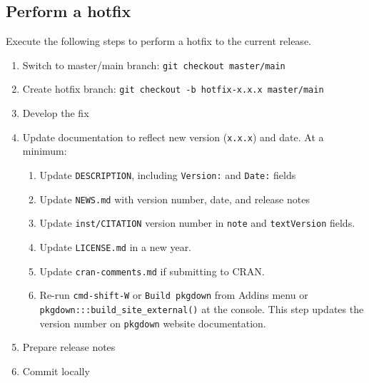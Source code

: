\documentclass{article}
\begin{document}
\subsection{Perform a hotfix} 
\label{sec:hotfix}

Execute the following steps to perform a hotfix to the current release.

\begin{enumerate}

  \item Switch to master/main branch: \texttt{git checkout master/main} 

  \item Create hotfix branch: \texttt{git checkout -b hotfix-x.x.x master/main} 
	
  \item Develop the fix
	
  \item Update documentation to reflect new version (\texttt{x.x.x}) and date.
        At a minimum:
  \begin{enumerate}

    \item Update \texttt{DESCRIPTION}, including \texttt{Version:} and \texttt{Date:} fields 
	
    \item Update \texttt{NEWS.md} with version number, date, and release notes
    
	\item Update \texttt{inst/CITATION} version number 
	      in \texttt{note} and \texttt{textVersion} fields.
		  
    \item Update \texttt{LICENSE.md} in a new year.
		  
    \item Update \texttt{cran-comments.md} if submitting to CRAN.
	
	\item Re-run \texttt{cmd-shift-W} or \texttt{Build pkgdown} from Addins menu or \\
		  \verb#pkgdown:::build_site_external()# at the console.
		  This step updates the version number on \texttt{pkgdown} website documentation. 

  \end{enumerate}
  \item Prepare release notes
  
  \item Commit locally
	

\end{enumerate}
\end{document}
